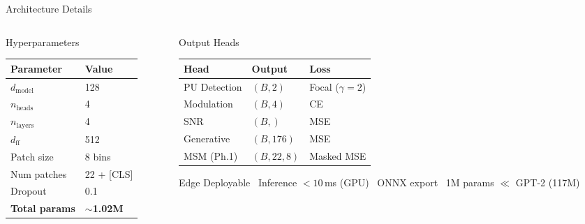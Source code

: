 \documentclass[aspectratio=169, 10pt]{beamer}
\newcommand{\cmark}{\textcolor{teal}{\ding{51}}}
\begin{document}
\begin{frame}{Architecture Details}
\small
\begin{columns}[T]
\begin{column}{0.45\textwidth}
\begin{block}{Hyperparameters}
\footnotesize
\renewcommand{\arraystretch}{1.3}
\begin{tabular}{@{}ll@{}}
\toprule
\textbf{Parameter} & \textbf{Value} \\
\midrule
$d_\text{model}$     & 128 \\
$n_\text{heads}$     & 4 \\
$n_\text{layers}$    & 4 \\
$d_\text{ff}$        & 512 \\
Patch size            & 8 bins \\
Num patches           & 22 + [CLS] \\
Dropout               & 0.1 \\
\textbf{Total params} & \textbf{$\sim$1.02M} \\
\bottomrule
\end{tabular}
\end{block}
\end{column}
\begin{column}{0.50\textwidth}
\begin{block}{Output Heads}
\footnotesize
\renewcommand{\arraystretch}{1.3}
\begin{tabular}{@{}lll@{}}
\toprule
\textbf{Head} & \textbf{Output} & \textbf{Loss} \\
\midrule
PU Detection & $(B,2)$ & Focal ($\gamma=2$) \\
Modulation   & $(B,4)$ & CE \\
SNR          & $(B,)$  & MSE \\
Generative   & $(B,176)$ & MSE \\
MSM (Ph.1)   & $(B,22,8)$ & Masked MSE \\
\bottomrule
\end{tabular}
\end{block}
\begin{exampleblock}{Edge Deployable}
\footnotesize
\cmark\ Inference $<10$\,ms (GPU) \;\;
\cmark\ ONNX export \;\;
\cmark\ 1M params $\ll$ GPT-2 (117M)
\end{exampleblock}
\end{column}
\end{columns}
\end{frame}
\end{document}
